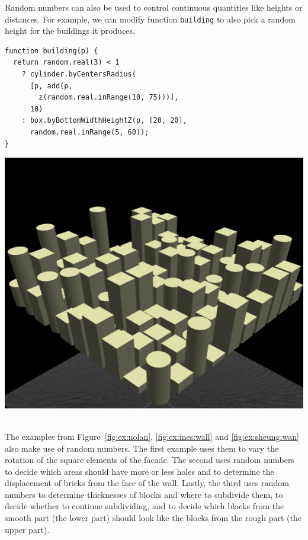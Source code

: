 Random numbers can also be used to control continuous quantities like heights or distances.
For example, we can modify function {\tt building} to also pick a random height for the buildings it produces.

\noindent
\begin{minipage}{1.0\textwidth}
\begin{minipage}{0.5\linewidth}
\begin{verbatim}
function building(p) {
  return random.real(3) < 1
    ? cylinder.byCentersRadius(
      [p, add(p,
        z(random.real.inRange(10, 75)))],
      10)
    : box.byBottomWidthHeightZ(p, [20, 20],
      random.real.inRange(5, 60));
}
\end{verbatim}
\end{minipage}%
\begin{minipage}{0.5\linewidth}
  \includegraphics[width=1.0\linewidth]{./images/detail_examples/box_cyl_city_random_crop}
\end{minipage}
\end{minipage}
\\

The examples from Figure~\ref{fig:ex:nolan}, \ref{fig:ex:ines:wall} and \ref{fig:ex:sheung:wan} also make use of random numbers.
The first example uses them to vary the rotation of the square elements of the facade.
The second uses random numbers to decide which areas should have more or less holes and to determine the displacement of bricks from the face of the wall.
Lastly, the third uses random numbers to determine thicknesses of blocks and where to subdivide them, to decide whether to continue subdividing, and to decide which blocks from the smooth part (the lower part) should look like the blocks from the rough part (the upper part).

